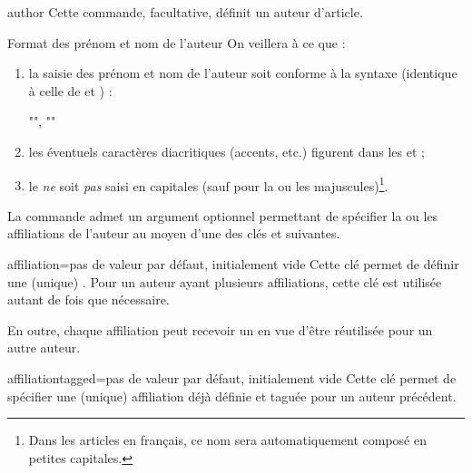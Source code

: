\documentclass[french,nolocaltoc]{nwejmart}
\newtheorem[title=Fait,style=definition]{fact}
\begin{document}
\begin{docCommand}{author}{}
  Cette commande, facultative, définit un auteur d'article.
\end{docCommand}
%
\begin{dbwarning}{Format des prénom et nom de l'auteur}{}
  On veillera à ce que :
  \begin{enumerate}
  \item la saisie des prénom et nom de l'auteur soit conforme à la syntaxe
    (identique à celle de  et ) :
\begin{bodycode}[listing options={showspaces}]
"", ""
\end{bodycode}
  \item les éventuels caractères diacritiques (accents, etc.) figurent dans les
     et  ;
  \item le  \emph{ne} soit \emph{pas} saisi en capitales (sauf pour la
    ou les majuscules)\footnote{Dans les articles en français, ce nom sera
      automatiquement composé en petites capitales.}.
  \end{enumerate}
\end{dbwarning}

La commande  admet un argument optionnel permettant de spécifier
la ou les affiliations de l'auteur au moyen d'une des clés 
et  suivantes.

\begin{docKey}{affiliation}{={}}{pas de valeur par défaut,
    initialement vide}
  Cette clé permet de définir une (unique) . Pour un auteur
  ayant plusieurs affiliations, cette clé est utilisée autant de fois que
  nécessaire.

  En outre, chaque affiliation peut recevoir un  en vue d'être
  réutilisée pour un autre auteur.
\end{docKey}

\begin{docKey}{affiliationtagged}{={}}{pas de valeur par défaut,
    initialement vide}
  Cette clé permet de spécifier une (unique) affiliation déjà définie et taguée
  pour un auteur précédent.
\end{docKey}

\end{document}

